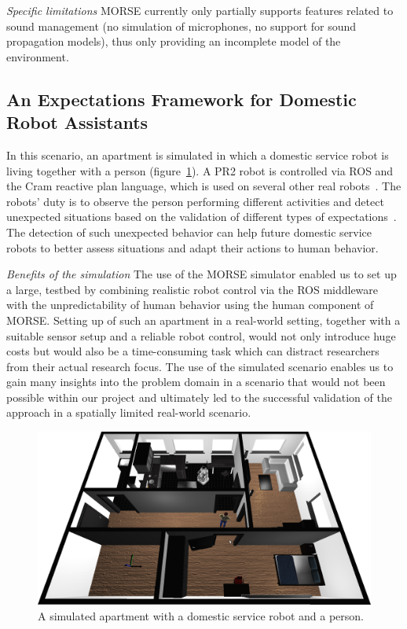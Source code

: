 \documentclass[conference]{IEEEtran}
\begin{document}
\emph{Specific limitations} MORSE currently only partially supports features
related to sound management (no simulation of microphones, no support for sound
propagation models), thus only providing an incomplete model of the environment.

\subsection{An Expectations Framework for Domestic Robot Assistants}
\label{sc:expectations}

In this scenario, an apartment is simulated in which a domestic 
service robot is living together with a person (figure~\ref{fig|apartment}). 
A PR2 robot is controlled via ROS and the {\sc Cram} reactive plan language, 
which is used on several other real robots~\cite{pancakes11humanoids}. The robots' 
duty is to observe the person performing different activities and detect unexpected 
situations based on the validation of different types of expectations~\cite{Karg2013}. 
The detection of such unexpected behavior can help future domestic service robots 
to better assess situations and adapt their actions to human behavior.

\emph{Benefits of the simulation} The use of the MORSE simulator enabled us to set up a large, 
testbed by combining realistic robot control via the ROS middleware with the
unpredictability of human behavior using the human component of MORSE. Setting
up of such an apartment in a real-world setting, together with a suitable
sensor setup and a reliable robot control, would not only introduce huge costs
but would also be a time-consuming task which can distract researchers from
their actual research focus. The use of the simulated scenario enables us to
gain many insights into the problem domain in a scenario that would not been
possible within our project and ultimately led to the successful validation of
the approach in a spatially limited real-world scenario.

\begin{figure}[H]
      \centering
      \includegraphics[width=0.9\linewidth]{morse_apartment.png}
      \caption{A simulated apartment with a domestic service robot and a person.}
      \label{fig|apartment}
\end{figure}
\end{document}
